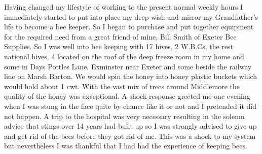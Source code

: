 Having changed my lifestyle of working to the present normal weekly hours I
immediately started to put into place my deep wish and mirror my Grandfather's
life to become a bee keeper. So I began to purchase and put together equipment
for the required need from a great friend of mine, Bill Smith of Exeter Bee
Supplies. So I was well into bee keeping with 17 hives, 2 W.B.Cs, the rest
national hives, 4 located on the roof of the deep freeze room in my home and
some in Days Pottles Lane, Exminster near Exeter and some beside the railway
line on Marsh Barton. We would spin the honey into honey plastic buckets which
would hold about 1 cwt. With the vast mix of trees around Middlemore the
quality of the honey was exceptional. A shock response greeted me one evening
when I was stung in the face quite by chance like it or not and I pretended it
did not happen. A trip to the hospital was very necessary resulting in the
solemn advice that stings over 14 years had built up so I was strongly advised
to give up and get rid of the bees before they got rid of me. This was a shock
to my system but nevertheless I was thankful that I had had the experience of
keeping bees.

